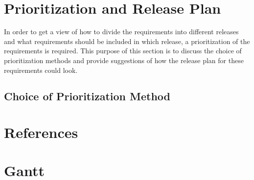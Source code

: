 \documentclass[a4paper,10pt]{article} \usepackage[margin=1.0in]{geometry} \usepackage{pdfpages} \usepackage{graphicx}
\begin{document}
\section{Prioritization and Release Plan}

In order to get a view of how to divide the requirements into different releases and what requirements should be included in which release, a prioritization of the requirements is required. 
This purpose of this section is to discuss the choice of prioritization methods and provide suggestions of how the release plan for these requirements could look.

\subsection{Choice of Prioritization Method}

\newpage
\section{References}
\newpage

\section{Gantt}
	\begin{minipage}{\textwidth}
		\\
	\end{minipage}
\end{document}
